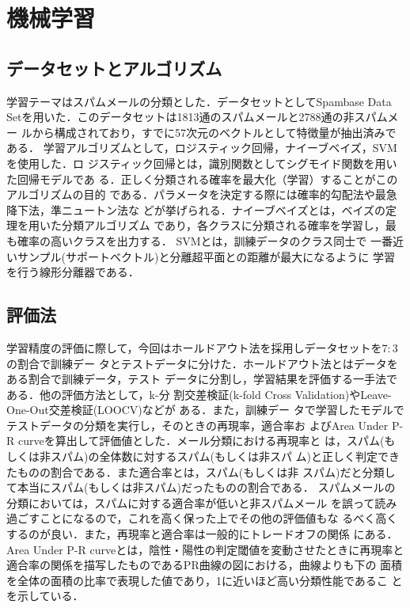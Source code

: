 \documentclass[a4paper,12pt]{jarticle}
\begin{document}
\section{機械学習}
\subsection{データセットとアルゴリズム}
学習テーマはスパムメールの分類とした．データセットとしてSpambase Data
Setを用いた．このデータセットは1813通のスパムメールと2788通の非スパムメー
ルから構成されており，すでに57次元のベクトルとして特徴量が抽出済みである．
学習アルゴリズムとして，ロジスティック回帰，ナイーブベイズ，SVMを使用した．ロ
ジスティック回帰とは，識別関数としてシグモイド関数を用いた回帰モデルであ
る．正しく分類される確率を最大化（学習）することがこのアルゴリズムの目的
である．パラメータを決定する際には確率的勾配法や最急降下法，準ニュートン法な
どが挙げられる．ナイーブベイズとは，ベイズの定理を用いた分類アルゴリズム
であり，各クラスに分類される確率を学習し，最も確率の高いクラスを出力する．
SVMとは，訓練データのクラス同士で
一番近いサンプル(サポートベクトル)と分離超平面との距離が最大になるように
学習を行う線形分離器である．

\subsection{評価法}
学習精度の評価に際して，今回はホールドアウト法を採用しデータセットを$7:3$の割合で訓練デー
タとテストデータに分けた．ホールドアウト法とはデータをある割合で訓練データ，テスト
データに分割し，学習結果を評価する一手法である．他の評価方法として，k-分
割交差検証(k-fold Cross Validation)やLeave-One-Out交差検証(LOOCV)などが
ある．また，訓練デー
タで学習したモデルでテストデータの分類を実行し，そのときの再現率，適合率お
よびArea Under P-R curveを算出して評価値とした．メール分類における再現率と
は，スパム(もしくは非スパム)の全体数に対するスパム(もしくは非スパ
ム)と正しく判定できたものの割合である．また適合率とは，スパム(もしくは非
スパム)だと分類して本当にスパム(もしくは非スパム)だったものの割合である．
スパムメールの分類においては，スパムに対する適合率が低いと非スパムメール
を誤って読み過ごすことになるので，これを高く保った上でその他の評価値もな
るべく高くするのが良い．また，再現率と適合率は一般的にトレードオフの関係
にある．Area Under P-R curveとは，陰性・陽性の判定閾値を変動させたときに再現率と適合率の関係を描写したものであるPR曲線の図における，曲線よりも下の
面積を全体の面積の比率で表現した値であり，1に近いほど高い分類性能であるこ
とを示している．
\end{document}
